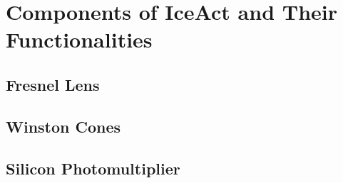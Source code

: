 \chapter{Components of IceAct and Their Functionalities}

\section{Fresnel Lens}

\section{Winston Cones}

\section{Silicon Photomultiplier}